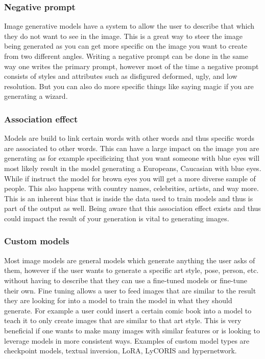 \subsubsection*{Negative prompt}
Image generative models have a system to allow the user to describe that which they do not want to see in the image. This is a great way to steer the image being generated as you can get more specific on the image you want to create from two different angles. Writing a negative prompt can be done in the same way one writes the primary prompt, however most of the time a negative prompt consists of styles and attributes such as disfigured deformed, ugly, and low resolution. But you can also do more specific things like saying magic if you are generating a wizard.
\subsubsection*{Association effect}
Models are build to link certain words with other words and thus specific words are associated to other words. This can have a large impact on the image you are generating as for example specificizing that you want someone with blue eyes will most likely result in the model generating a Europeans, Caucasian with blue eyes. While if instruct the model for brown eyes you will get a more diverse sample of people. This also happens with country names, celebrities, artists, and way more. This is an inherent bias that is inside the data used to train models and thus is part of the output as well. Being aware that this association effect exists and thus could impact the result of your generation is vital to generating images.
\subsubsection*{Custom models}
 Most image models are general models which generate anything the user asks of them, however if the user wants to generate a specific art style, pose, person, etc. without having to describe that they can use a fine-tuned models or fine-tune their own. Fine tuning allows a user to feed images that are similar to the result they are looking for into a model to train the model in what they should generate. For example a user could insert a certain comic book into a model to teach it to only create images that are similar to that art style. This is very beneficial if one wants to make many images with similar features or is looking to leverage models in more consistent ways. Examples of custom model types are checkpoint models, textual inversion, LoRA, LyCORIS and hypernetwork.
